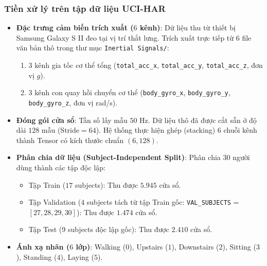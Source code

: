 \subsubsection{Tiền xử lý trên tập dữ liệu UCI-HAR}
\begin{itemize}
    \item \textbf{Đặc trưng cảm biến trích xuất ($6$ kênh)}: 
    Dữ liệu thu từ thiết bị Samsung Galaxy S II đeo tại vị trí thắt lưng. Trích xuất trực tiếp từ 6 file văn bản thô trong thư mục \texttt{Inertial Signals/}:
    \begin{enumerate}
        \item $3$ kênh gia tốc cơ thể tổng (\texttt{total\_acc\_x}, \texttt{total\_acc\_y}, \texttt{total\_acc\_z}, đơn vị $g$).
        \item $3$ kênh con quay hồi chuyển cơ thể (\texttt{body\_gyro\_x}, \texttt{body\_gyro\_y}, \texttt{body\_gyro\_z}, đơn vị rad/s).
    \end{enumerate}
    \item \textbf{Đóng gói cửa sổ}: Tần số lấy mẫu $50\text{ Hz}$. Dữ liệu thô đã được cắt sẵn ở độ dài $128$ mẫu ($\text{Stride} = 64$). Hệ thống thực hiện ghép (stacking) $6$ chuỗi kênh thành Tensor có kích thước chuẩn $(6, 128)$.
    \item \textbf{Phân chia dữ liệu (Subject-Independent Split)}: Phân chia $30$ người dùng thành các tập độc lập:
    \begin{itemize}
        \item Tập Train ($17$ subjects): Thu được $5.945$ cửa sổ.
        \item Tập Validation ($4$ subjects tách từ tập Train gốc: \texttt{VAL\_SUBJECTS} = $[27, 28, 29, 30]$): Thu được $1.474$ cửa sổ.
        \item Tập Test ($9$ subjects độc lập gốc): Thu được $2.410$ cửa sổ.
    \end{itemize}
    \item \textbf{Ánh xạ nhãn ($6$ lớp)}: Walking ($0$), Upstairs ($1$), Downstairs ($2$), Sitting ($3$), Standing ($4$), Laying ($5$).
\end{itemize}
